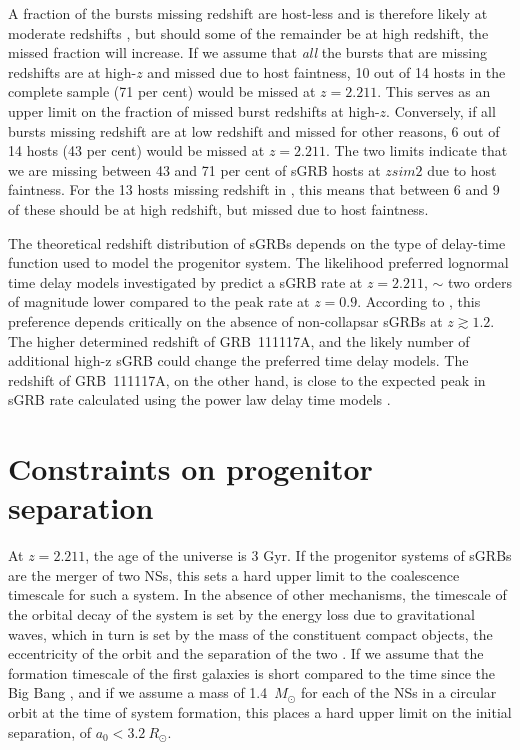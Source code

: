 \documentclass{aa}    %
\begin{document}
A fraction of the bursts missing redshift are host-less and is therefore likely
at moderate redshifts \citep{Tunnicliffe2014}, but should some of the remainder
be at high redshift, the missed fraction will increase. If we assume that
\textit{all} the bursts that are missing redshifts are at high-$z$ and missed
due to host faintness, 10 out of 14 hosts in the complete sample (71 per cent)
would be missed at $z = 2.211$. This serves as an upper limit on the fraction of
missed burst redshifts at high-$z$. Conversely, if all bursts missing redshift
are at low redshift and missed for other reasons, 6 out of 14 hosts (43 per
cent) would be missed at $z = 2.211$. The two limits indicate that we are
missing between 43 and 71 per cent of sGRB hosts at $z sim 2$ due to host
faintness. For the 13 hosts missing redshift in \citet{Berger2014}, this means
that between 6 and 9 of these should be at high redshift, but missed due to host
faintness.

The theoretical redshift distribution of sGRBs depends on the type of delay-time
function used to model the progenitor system. The likelihood preferred lognormal
time delay models investigated by \citet{Wanderman2015} predict a sGRB rate at
$z = 2.211$, $\sim$ two orders of magnitude lower compared to the peak rate at
$z = 0.9$. According to \citet{Wanderman2015}, this preference depends
critically on the absence of non-collapsar sGRBs at $z \gtrsim 1.2$. The higher
determined redshift of GRB~111117A, and the likely number of additional high-z
sGRB could change the preferred time delay models. The redshift of GRB~111117A,
on the other hand, is close to the expected peak in sGRB rate calculated using
the power law delay time models \citep{Behroozi2014, Wanderman2015}.


\section{Constraints on progenitor separation}

At $z = 2.211$, the age of the universe is 3 Gyr. If the progenitor systems of
sGRBs are the merger of two NSs, this sets a hard upper limit to the coalescence
timescale for such a system. In the absence of other mechanisms, the timescale
of the orbital decay of the system is set by the energy loss due to
gravitational waves, which in turn is set by the mass of the constituent compact
objects, the eccentricity of the orbit and the separation of the two \citep{Postnov2014}. If we assume that the
formation timescale of the first galaxies is short compared to the time since
the Big Bang \citep{Richard2011}, and if we assume a mass of 1.4~$M_\odot$ for
each of the NSs in a circular orbit at the time of system formation, this places
a hard upper limit on the initial separation, of $a_0 < 3.2~R_\odot$.
\end{document}
